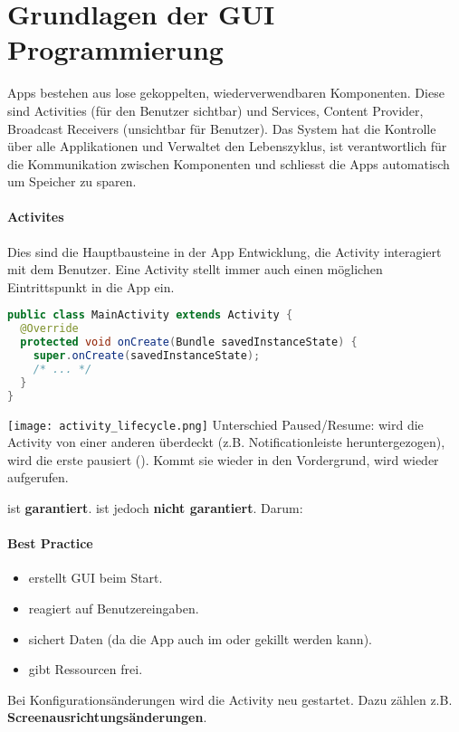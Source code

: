 \section{Grundlagen der GUI Programmierung}
Apps bestehen aus lose gekoppelten, wiederverwendbaren Komponenten. Diese sind Activities (für den Benutzer sichtbar) und Services, Content Provider, Broadcast Receivers (unsichtbar für Benutzer). Das System hat die Kontrolle über alle Applikationen und Verwaltet den Lebenszyklus, ist verantwortlich für die Kommunikation zwischen Komponenten und schliesst die Apps automatisch um Speicher zu sparen.
\paragraph{Activites} Dies sind die Hauptbausteine in der App Entwicklung, die Activity interagiert mit dem Benutzer. Eine Activity stellt immer auch einen möglichen Eintrittspunkt in die App ein.
\begin{lstlisting}[language=java]
public class MainActivity extends Activity {
  @Override
  protected void onCreate(Bundle savedInstanceState) {
    super.onCreate(savedInstanceState);
    /* ... */
  }
}
\end{lstlisting}
\texttt{[image: activity\_lifecycle.png]}
Unterschied Paused/Resume: wird die Activity von einer anderen überdeckt (z.B. Notificationleiste heruntergezogen), wird die erste pausiert (). Kommt sie wieder in den Vordergrund, wird wieder  aufgerufen.

 ist \textbf{garantiert}.  ist jedoch \textbf{nicht garantiert}. Darum:

\paragraph{Best Practice}

\begin{itemize}
  \item {} erstellt GUI beim Start.
  \item {} reagiert auf Benutzereingaben.
  \item {} sichert Daten (da die App auch im  oder  gekillt werden kann).
  \item {} gibt Ressourcen frei.
\end{itemize}

Bei Konfigurationsänderungen wird die Activity neu gestartet. Dazu zählen z.B. \textbf{Screenausrichtungsänderungen}.

